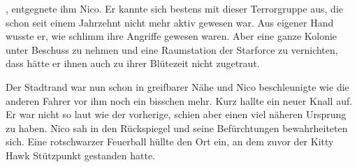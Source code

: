 \par

, entgegnete ihm Nico. Er kannte sich bestens mit dieser Terrorgruppe aus, die schon seit einem Jahrzehnt nicht mehr aktiv gewesen war. Aus eigener Hand wusste er, wie schlimm ihre Angriffe gewesen waren. Aber eine ganze Kolonie unter Beschuss zu nehmen und eine Raumstation der Starforce zu vernichten, dass hätte er ihnen auch zu ihrer Blütezeit nicht zugetraut.

\par

Der Stadtrand war nun schon in greifbarer Nähe und Nico beschleunigte wie die anderen Fahrer vor ihm noch ein bisschen mehr. Kurz hallte ein neuer Knall auf. Er war nicht so laut wie der vorherige, schien aber einen viel näheren Ursprung zu haben. Nico sah in den Rückspiegel und seine Befürchtungen bewahrheiteten sich. Eine rotschwarzer Feuerball hüllte den Ort ein, an dem zuvor der Kitty Hawk Stützpunkt gestanden hatte.
